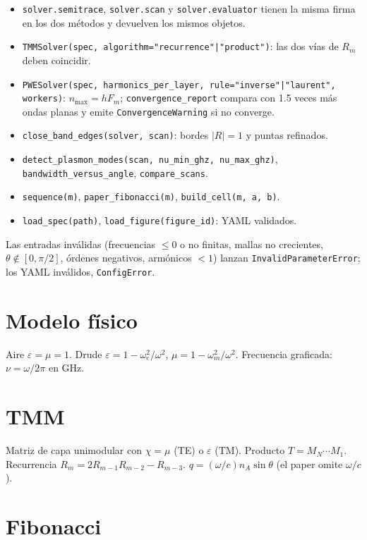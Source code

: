\documentclass[11pt,a4paper]{article}
\begin{document}
\begin{itemize}
\item \texttt{solver.semitrace}, \texttt{solver.scan} y \texttt{solver.evaluator}
tienen la misma firma en los dos métodos y devuelven los mismos objetos.
\item \texttt{TMMSolver(spec, algorithm="recurrence"|"product")}: las dos vías de
$R_m$ deben coincidir.
\item \texttt{PWESolver(spec, harmonics\_per\_layer, rule="inverse"|"laurent", workers)}:
$n_{\max}=hF_m$; \texttt{convergence\_report} compara con 1.5 veces más ondas
planas y emite \texttt{ConvergenceWarning} si no converge.
\item \texttt{close\_band\_edges(solver, scan)}: bordes $|R|=1$ y puntas refinados.
\item \texttt{detect\_plasmon\_modes(scan, nu\_min\_ghz, nu\_max\_ghz)},
\texttt{bandwidth\_versus\_angle}, \texttt{compare\_scans}.
\item \texttt{sequence(m)}, \texttt{paper\_fibonacci(m)}, \texttt{build\_cell(m, a, b)}.
\item \texttt{load\_spec(path)}, \texttt{load\_figure(figure\_id)}: YAML validados.
\end{itemize}

Las entradas inválidas (frecuencias $\le 0$ o no finitas, mallas no crecientes,
$\theta\notin[0,\pi/2]$, órdenes negativos, armónicos $<1$) lanzan
\texttt{InvalidParameterError}; los YAML inválidos, \texttt{ConfigError}.

\section{Modelo físico}

Aire $\varepsilon=\mu=1$. Drude $\varepsilon=1-\omega_e^2/\omega^2$,
$\mu=1-\omega_m^2/\omega^2$. Frecuencia graficada: $\nu=\omega/2\pi$ en GHz.

\section{TMM}

Matriz de capa unimodular con $\chi=\mu$ (TE) o $\varepsilon$ (TM).
Producto $T=M_N\cdots M_1$. Recurrencia $R_m=2R_{m-1}R_{m-2}-R_{m-3}$.
$q=(\omega/c)n_A\sin\theta$ (el paper omite $\omega/c$).

\section{Fibonacci}
\end{document}
